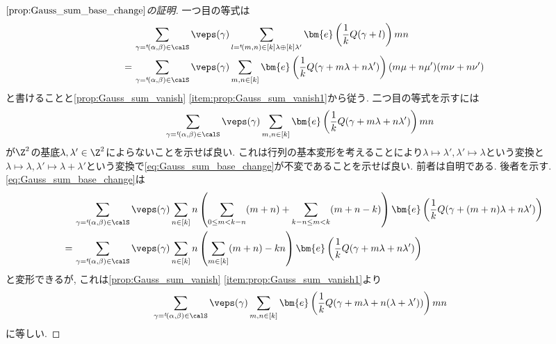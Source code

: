 \documentclass[11pt,b5paper,oneside,lualatex]{ltjsarticle} %
\numberwithin{equation}{section} %
\begin{document}
\begin{proof}[$ \cref{prop:Gauss_sum_base_change} $の証明]
	一つ目の等式は
	\begin{align}
		&\sum_{\gamma = {}^t\!(\alpha, \beta) \in \calS} 
		\veps(\gamma)
		\sum_{l = {}^t\!(m, n) \in [k] \lambda \oplus [k] \lambda'}
		\bm{e}\left( \frac{1}{k} Q(\gamma + l) \right) mn
		\\			
		= \,
		&\sum_{\gamma = {}^t\!(\alpha, \beta) \in \calS} 
		\veps(\gamma)
		\sum_{m, n \in [k]}
		\bm{e}\left( \frac{1}{k} Q(\gamma + m \lambda + n \lambda') \right) (m \mu + n \mu')(m \nu + n \nu')
	\end{align}
	と書けることと\cref{prop:Gauss_sum_vanish} \cref{item:prop:Gauss_sum_vanish1}から従う. 
	二つ目の等式を示すには
	\begin{align} \label{eq:Gauss_sum_base_change}
		&\sum_{\gamma = {}^t\!(\alpha, \beta) \in \calS} 
		\veps(\gamma)
		\sum_{m, n \in [k]}
		\bm{e}\left( \frac{1}{k} Q(\gamma + m \lambda + n \lambda') \right) mn
	\end{align}
	が$ \Z^2 $の基底$ \lambda, \lambda' \in \Z^2 $によらないことを示せば良い. 
	これは行列の基本変形を考えることにより$ \lambda \mapsto \lambda', \lambda' \mapsto \lambda $という変換と
	$ \lambda \mapsto \lambda, \lambda' \mapsto \lambda + \lambda' $という変換で\cref{eq:Gauss_sum_base_change}が不変であることを示せば良い. 
	前者は自明である. 
	後者を示す. 
	\cref{eq:Gauss_sum_base_change}は
	\begin{align}
		&\sum_{\gamma = {}^t\!(\alpha, \beta) \in \calS} 
		\veps(\gamma)
		\sum_{n \in [k]} n
		\left( \sum_{0 \le m < k-n} (m+n) + \sum_{k-n \le m < k} (m+n-k) \right)
		\bm{e}\left( \frac{1}{k} Q(\gamma + (m+n) \lambda + n \lambda') \right)
		\\
		= \,
		&\sum_{\gamma = {}^t\!(\alpha, \beta) \in \calS} 
		\veps(\gamma)
		\sum_{n \in [k]} n
		\left( \sum_{m \in [k]} (m+n) - kn \right)
		\bm{e}\left( \frac{1}{k} Q(\gamma + m \lambda + n \lambda') \right)
	\end{align}
	と変形できるが, これは\cref{prop:Gauss_sum_vanish} \cref{item:prop:Gauss_sum_vanish1}より
	\begin{align}
		&\sum_{\gamma = {}^t\!(\alpha, \beta) \in \calS} 
		\veps(\gamma)
		\sum_{m, n \in [k]}
		\bm{e}\left( \frac{1}{k} Q(\gamma + m \lambda + n (\lambda +\lambda')) \right) mn
	\end{align}
	に等しい. 
\end{proof}

\end{document}
